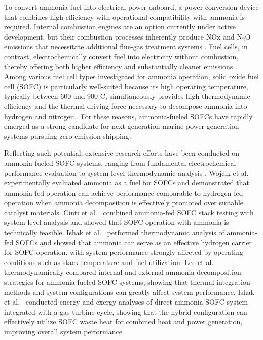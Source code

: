 \documentclass[a4paper,10pt]{cas-dc} %
\begin{document}
To convert ammonia fuel into electrical power onboard, a power conversion device that combines high efficiency with operational compatibility with ammonia is required.
Internal combustion engines are an option currently under active development, but their combustion processes inherently produce NOx and N$_2$O emissions that necessitate additional flue-gas treatment systems \cite{Nygard2025N2ORemoval}.
Fuel cells, in contrast, electrochemically convert fuel into electricity without combustion, thereby offering both higher efficiency and substantially cleaner emissions \cite{VANBIERT2016345}.
Among various fuel cell types investigated for ammonia operation, solid oxide fuel cell (SOFC) is particularly well-suited because its high operating temperature, typically between 600 and 900 \textdegree C, simultaneously provides high thermodynamic efficiency and the thermal driving force necessary to decompose ammonia into hydrogen and nitrogen \cite{10.1039/d3qi01557b,10.1039/d0ta08810b}.
For these reasons, ammonia-fueled SOFCs have rapidly emerged as a strong candidate for next-generation marine power generation systems pursuing zero-emission shipping.

Reflecting such potential, extensive research efforts have been conducted on ammonia-fueled SOFC systems, ranging from fundamental electrochemical performance evaluation to system-level thermodynamic analysis \cite{WOJCIK2003342,CINTI201613583,ISHAK2012157,LEE2025238271,ISHAK201273}.
Wojcik et al.~\cite{WOJCIK2003342} experimentally evaluated ammonia as a fuel for SOFCs and demonstrated that ammonia-fed operation can achieve performance comparable to hydrogen-fed operation when ammonia decomposition is effectively promoted over suitable catalyst materials.
Cinti et al.~\cite{CINTI201613583} combined ammonia-fed SOFC stack testing with system-level analysis and showed that SOFC operation with ammonia is technically feasible.
Ishak et al.~\cite{ISHAK2012157} performed thermodynamic analysis of ammonia-fed SOFCs and showed that ammonia can serve as an effective hydrogen carrier for SOFC operation, with system performance strongly affected by operating conditions such as stack temperature and fuel utilization.
Lee et al.~\cite{LEE2025238271} thermodynamically compared internal and external ammonia decomposition strategies for ammonia-fueled SOFC systems, showing that thermal integration methods and system configurations can greatly affect system performance.
Ishak et al.~\cite{ISHAK201273} conducted energy and exergy analyses of direct ammonia SOFC system integrated with a gas turbine cycle, showing that the hybrid configuration can effectively utilize SOFC waste heat for combined heat and power generation, improving overall system performance.
\end{document}
